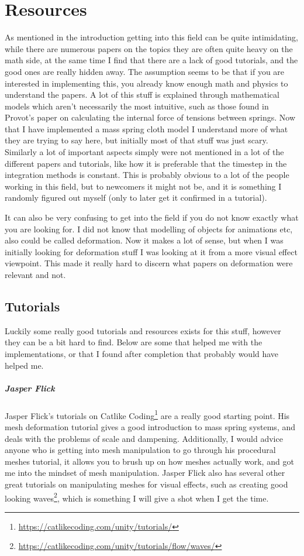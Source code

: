 \chapter{Resources}
As mentioned in the introduction getting into this field can be quite intimidating,
while there are numerous papers on the topics they are often quite heavy on the math side,
at the same time I find that there are a lack of good tutorials, and the good ones are really hidden away.
The assumption seems to be that if you are interested in implementing this, 
you already know enough math and physics to understand the papers.
A lot of this stuff is explained through mathematical models which aren't necessarily the most intuitive,
such as those found in Provot's paper\cite{provot_mass_spring} on calculating the internal force of tensions between springs.
Now that I have implemented a mass spring cloth model I understand more of what they are trying to say here,
but initially most of that stuff was just scary.
Similarly a lot of important aspects simply were not mentioned in a lot of the different papers and tutorials,
like how it is preferable that the timestep in the integration methods is constant.
This is probably obvious to a lot of the people working in this field, but to newcomers it might not be,
and it is something I randomly figured out myself (only to later get it confirmed in a tutorial).

It can also be very confusing to get into the field if you do not know exactly what you are looking for. 
I did not know that modelling of objects for animations etc, also could be called deformation.
Now it makes a lot of sense, but when I was initially looking for deformation stuff I was looking at it from a more visual effect
viewpoint. This made it really hard to discern what papers on deformation were relevant and not.

\section{Tutorials}
Luckily some really good tutorials and resources exists for this stuff, however they can be a bit hard to find.
Below are some that helped me with the implementations, or that I found after completion that probably would have helped me.

\paragraph{Jasper Flick}
Jasper Flick's tutorials on Catlike Coding\footnote{\url{https://catlikecoding.com/unity/tutorials/}}
are a really good starting point. His mesh deformation tutorial gives a good introduction to mass spring systems, and deals with the problems of scale and dampening.
Additionally, I would advice anyone who is getting into mesh manipulation to go through his procedural meshes tutorial,
it allows you to brush up on how meshes actually work, and got me into the mindset of mesh manipulation.
Jasper Flick also has several other great tutorials on manipulating meshes for visual effects, such as creating good looking waves\footnote{\url{https://catlikecoding.com/unity/tutorials/flow/waves/}}, which is something I will give a shot when I get the time.

